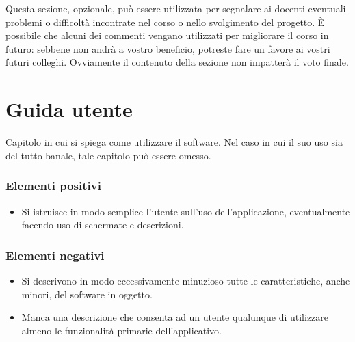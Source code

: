 \documentclass[a4paper,12pt]{report}
\begin{document}
Questa sezione, opzionale, può essere utilizzata per segnalare ai docenti eventuali problemi o difficoltà incontrate nel corso o nello svolgimento del progetto.
%
È possibile che alcuni dei commenti vengano utilizzati per migliorare il corso in futuro: sebbene non andrà a vostro beneficio, potreste fare un favore ai vostri futuri colleghi.
%
Ovviamente il contenuto della sezione non impatterà il voto finale.

\appendix
\chapter{Guida utente}

Capitolo in cui si spiega come utilizzare il software. Nel caso in cui il suo uso sia del tutto banale, tale capitolo può essere omesso.

\subsection*{Elementi positivi}

\begin{itemize}
 \item Si istruisce in modo semplice l'utente sull'uso dell'applicazione, eventualmente facendo uso di schermate e descrizioni.
\end{itemize}

\subsection*{Elementi negativi}
\begin{itemize}
 \item Si descrivono in modo eccessivamente minuzioso tutte le caratteristiche, anche minori, del software in oggetto.
 \item Manca una descrizione che consenta ad un utente qualunque di utilizzare almeno le funzionalità primarie dell'applicativo.
\end{itemize}



\end{document}
